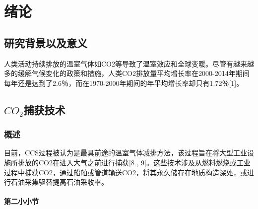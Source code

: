 \chapter{绪\quad 论}

\section{研究背景以及意义}

人类活动持续排放的温室气体如CO2等导致了温室效应和全球变暖。尽管有越来越多的缓解气候变化的政策和措施，人类CO2排放量平均增长率在2000-2014年期间每年还是达到了2.6％，而在1970-2000年期间的年平均增长率却只有1.72％[1]。

\section{$CO_2$捕获技术}

\subsection{概述}

目前，CCS过程被认为是最具前途的温室气体减排方法，该过程旨在将大型工业设施所排放的CO2在进入大气之前进行捕获[8 , 9]。这些技术涉及从燃料燃烧或工业过程中捕获CO2，通过船舶或管道输送CO2，将其永久储存在地质构造深处，或进行石油采集驱替提高石油采收率。

\subsubsection{第二小小节}

